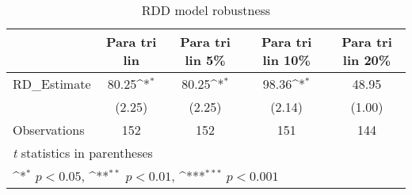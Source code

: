 \begin{table}[htbp]\centering
\def\sym#1{\ifmmode^{#1}\else\(^{#1}\)\fi}
\caption{RDD model robustness\label{tab:model2-robustness}}
\begin{tabular}{l*{4}{c}}
\toprule
                    &\multicolumn{1}{c}{Para tri lin}&\multicolumn{1}{c}{Para tri lin 5\%}&\multicolumn{1}{c}{Para tri lin 10\%}&\multicolumn{1}{c}{Para tri lin 20\%}\\
\midrule
RD\_Estimate         &       80.25\sym{*}  &       80.25\sym{*}  &       98.36\sym{*}  &       48.95         \\
                    &      (2.25)         &      (2.25)         &      (2.14)         &      (1.00)         \\
\midrule
Observations        &         152         &         152         &         151         &         144         \\
\bottomrule
\multicolumn{5}{l}{\footnotesize \textit{t} statistics in parentheses}\\
\multicolumn{5}{l}{\footnotesize \sym{*} \(p<0.05\), \sym{**} \(p<0.01\), \sym{***} \(p<0.001\)}\\
\end{tabular}
\end{table}
